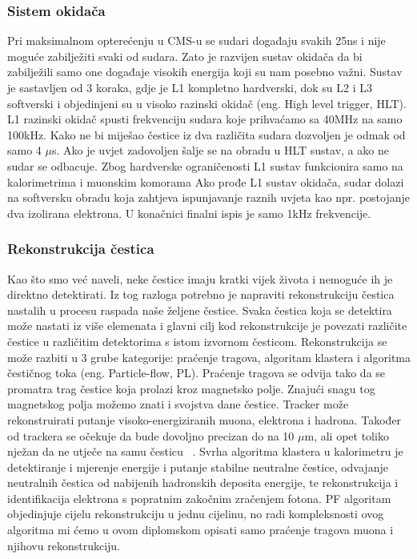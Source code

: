 \documentclass[12pt,a4paper,oneside]{article}
\begin{document}
\begin{linenumbers}
		\subsubsection{Sistem okidača}
		Pri maksimalnom opterećenju u CMS-u se sudari događaju svakih 25ns i nije moguće zabilježiti svaki od sudara. Zato je razvijen sustav okidača da bi zabilježili samo one događaje visokih energija  koji su nam posebno važni. Sustav je sastavljen od 3 koraka, gdje je L1 kompletno hardverski, dok su L2 i L3 softverski i objedinjeni su u visoko razinski okidač (eng. High level trigger, HLT).
		L1 razinski okidač spusti frekvenciju sudara koje prihvaćamo sa 40MHz na samo 100kHz. Kako ne bi miješao čestice iz dva različita sudara dozvoljen je odmak od samo 4 {$\mu$}s. Ako je uvjet zadovoljen šalje se na obradu u HLT sustav, a ako ne sudar se odbacuje. Zbog hardverske ograničenosti L1 sustav funkcionira samo na kalorimetrima i muonskim komorama
		Ako prođe L1 sustav okidača, sudar dolazi na softversku obradu koja zahtjeva ispunjavanje raznih uvjeta kao npr. postojanje dva izolirana elektrona.  U konačnici finalni ispis je samo 1kHz frekvencije.~\cite{doktorat}
		
		\subsubsection{Rekonstrukcija čestica}
		Kao što smo već naveli, neke čestice imaju kratki vijek života i nemoguće ih je direktno detektirati. Iz tog razloga potrebno je napraviti rekonstrukciju čestica nastalih u procesu raspada naše željene čestice. Svaka čestica koja se detektira može nastati iz više elemenata i glavni cilj kod rekonstrukcije je povezati različite čestice u različitim detektorima s istom izvornom česticom. 
		Rekonstrukcija se može razbiti u 3 grube kategorije: praćenje tragova, algoritam klastera i algoritma čestičnog toka (eng. Particle-flow, PL).
		Praćenje tragova se odvija tako da se promatra trag čestice koja prolazi kroz magnetsko polje. Znajući snagu tog magnetskog polja možemo znati i svojstva dane čestice. Tracker može rekonstruirati putanje visoko-energiziranih muona, elektrona i hadrona. Također od trackera se očekuje da bude dovoljno precizan do na 10 $\mu$m, ali opet toliko nježan da ne utječe na samu česticu ~\cite{cern-tracker}.
		Svrha algoritma klastera u kalorimetru je detektiranje i mjerenje energije  i putanje stabilne neutralne čestice, odvajanje neutralnih čestica od nabijenih hadronskih deposita energije, te rekonstrukcija i identifikacija elektrona  s popratnim zakočnim zračenjem fotona.
		PF algoritam objedinjuje cijelu rekonstrukciju u jednu cijelinu, no radi kompleksnosti ovog algoritma mi ćemo u ovom diplomskom opisati samo praćenje tragova muona i njihovu rekonstrukciju.
		

\end{linenumbers}
\end{document}
